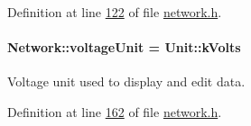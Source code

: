 Definition at line \hyperlink{network_8h_source_l00122}{122} of file \hyperlink{network_8h_source}{network.\+h}.

\hypertarget{group___models_gacde031ef95f5c05565ee35769f2ed89e}{}
\paragraph[{voltage\+Unit}]{ Network\+::voltage\+Unit = {\bf Unit\+::k\+Volts}\hspace{0.3cm}{\ttfamily [static]}}\label{group___models_gacde031ef95f5c05565ee35769f2ed89e}
Voltage unit used to display and edit data. 

Definition at line \hyperlink{network_8h_source_l00162}{162} of file \hyperlink{network_8h_source}{network.\+h}.

